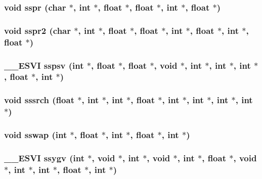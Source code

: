 \subsubsection{\setlength{\rightskip}{0pt plus 5cm}void sspr (char $\ast$, int $\ast$, float $\ast$, float $\ast$, int $\ast$, float $\ast$)}\label{essl_8h_3bb40f3cf57261c0c35e93c376737d47}


\subsubsection{\setlength{\rightskip}{0pt plus 5cm}void sspr2 (char $\ast$, int $\ast$, float $\ast$, float $\ast$, int $\ast$, float $\ast$, int $\ast$, float $\ast$)}\label{essl_8h_9337e17cae8804761fcede49462988b3}


\subsubsection{\setlength{\rightskip}{0pt plus 5cm}\_\-\_\-ESVI sspsv (int $\ast$, float $\ast$, float $\ast$, void $\ast$, int $\ast$, int $\ast$, int $\ast$, float $\ast$, int $\ast$)}\label{essl_8h_ba41f3bec53e35f63c39dd5e39556549}


\subsubsection{\setlength{\rightskip}{0pt plus 5cm}void sssrch (float $\ast$, int $\ast$, int $\ast$, float $\ast$, int $\ast$, int $\ast$, int $\ast$, int $\ast$)}\label{essl_8h_4854cae9fb70894901940698c52d8b0e}


\subsubsection{\setlength{\rightskip}{0pt plus 5cm}void sswap (int $\ast$, float $\ast$, int $\ast$, float $\ast$, int $\ast$)}\label{essl_8h_b6863964859aa6b48f730a381456debb}


\subsubsection{\setlength{\rightskip}{0pt plus 5cm}\_\-\_\-ESVI ssygv (int $\ast$, void $\ast$, int $\ast$, void $\ast$, int $\ast$, float $\ast$, void $\ast$, int $\ast$, int $\ast$, float $\ast$, int $\ast$)}\label{essl_8h_428a331db5de6c6fb163a2fc8cba7726}


